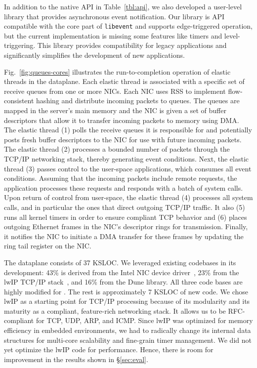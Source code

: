 In addition to the native \ix API in Table~\ref{tbl:api}, we also
developed a user-level library that provides asynchronous event
notification. Our library is API compatible with the core part of
\texttt{libevent} and supports edge-triggered operation, but the
current implementation is missing some features like timers and
level-triggering. This library provides compatibility for
legacy applications and significantly simplifies the development of
new applications.

 

Fig.~\ref{fig:queues-cores} illustrates the run-to-completion
operation of elastic threads in the \ix dataplane. Each elastic thread
is associated with a specific set of receive queues from one or more
NICs. Each NIC uses RSS to implement flow-consistent hashing and
distribute incoming packets to queues. The queues are mapped in the
server's main memory and the NIC is given a set of buffer descriptors
that allow it to transfer incoming packets to memory using DMA\@.  The
elastic thread (1) polls the receive queues it is responsible for and
potentially posts fresh buffer descriptors to the NIC for use with
future incoming packets. The elastic thread (2) processes a bounded
number of packets through the TCP/IP networking stack, thereby
generating event conditions. Next, the elastic thread (3) passes
control to the user-space applications, which consumes all event
conditions. Assuming that the incoming packets include remote
requests, the application processes these requests and responds with a
batch of system calls. Upon return of control from user-space, the
elastic thread (4) processes all system calls, and in particular the
ones that direct outgoing TCP/IP traffic. It also (5) runs all kernel
timers in order to ensure compliant TCP behavior and (6) places
outgoing Ethernet frames in the NIC's descriptor rings for
transmission. Finally, it notifies the NIC to initiate a DMA transfer
for these frames by updating the ring tail register on the NIC\@. 

The \ix dataplane consists of 37 KSLOC\@. We leveraged existing
codebases in its development: 43\% is derived from the Intel NIC
device driver~\cite{intel:dpdk}, 23\% from the lwIP TCP/IP
stack~\cite{dunkels2001design}, and 16\% from the Dune library.  All
three code bases are highly modified for \ix. The rest is
approximately 7 KSLOC of new code. We chose lwIP as a starting point
for TCP/IP processing because of its modularity and its maturity as a
compliant, feature-rich networking stack. It allows us to be
RFC-compliant for TCP, UDP, ARP, and ICMP\@. Since lwIP was
optimized for memory efficiency in embedded environments, we had to
radically change its internal data structures for multi-core
scalability and fine-grain timer management. We did not yet optimize
the lwIP code for performance. Hence, there is room for improvement in
the results shown in \S\ref{sec:eval}. 


